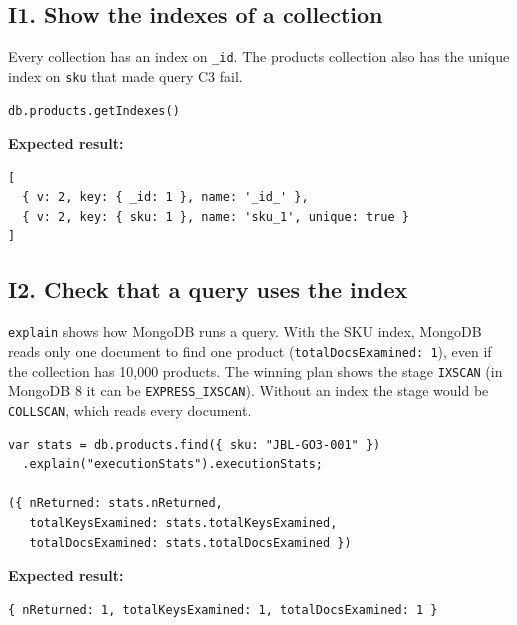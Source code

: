 \documentclass[11pt,a4paper]{article}
\newcommand{\code}[1]{\texttt{#1}}
\begin{document}
\subsection*{I1. Show the indexes of a collection}
Every collection has an index on \code{\_id}. The products collection also has the unique index on \code{sku} that made query C3 fail.

\begin{minipage}{\linewidth}
\begin{lstlisting}[style=query]
db.products.getIndexes()
\end{lstlisting}
\end{minipage}

\noindent\textbf{Expected result:}
\begin{lstlisting}[style=result]
[
  { v: 2, key: { _id: 1 }, name: '_id_' },
  { v: 2, key: { sku: 1 }, name: 'sku_1', unique: true }
]
\end{lstlisting}

\subsection*{I2. Check that a query uses the index}
\code{explain} shows how MongoDB runs a query. With the SKU index, MongoDB reads only one document to find one product (\code{totalDocsExamined: 1}), even if the collection has 10,000 products. The winning plan shows the stage \code{IXSCAN} (in MongoDB 8 it can be \code{EXPRESS\_IXSCAN}). Without an index the stage would be \code{COLLSCAN}, which reads every document.

\begin{minipage}{\linewidth}
\begin{lstlisting}[style=query]
var stats = db.products.find({ sku: "JBL-GO3-001" })
  .explain("executionStats").executionStats;

({ nReturned: stats.nReturned,
   totalKeysExamined: stats.totalKeysExamined,
   totalDocsExamined: stats.totalDocsExamined })
\end{lstlisting}
\end{minipage}

\noindent\textbf{Expected result:}
\begin{lstlisting}[style=result]
{ nReturned: 1, totalKeysExamined: 1, totalDocsExamined: 1 }
\end{lstlisting}
\end{document}
